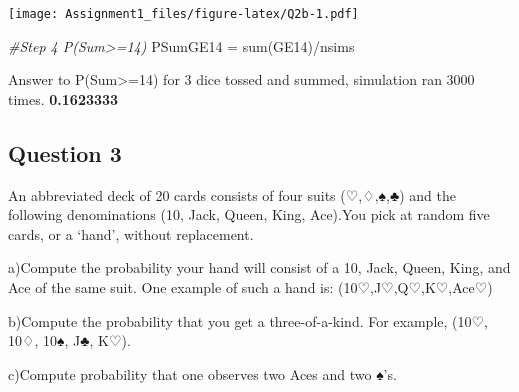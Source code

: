 \documentclass[
]{article}
\newenvironment{Shaded}{\begin{snugshade}}{\end{snugshade}}
\newcommand{\CommentTok}[1]{\textcolor[rgb]{0.56,0.35,0.01}{\textit{#1}}}
\newcommand{\FunctionTok}[1]{\textcolor[rgb]{0.00,0.00,0.00}{#1}}
\newcommand{\NormalTok}[1]{#1}
\newcommand{\OtherTok}[1]{\textcolor[rgb]{0.56,0.35,0.01}{#1}}
\newcommand{\SpecialCharTok}[1]{\textcolor[rgb]{0.00,0.00,0.00}{#1}}
\begin{document}
\texttt{[image: Assignment1\_files/figure-latex/Q2b-1.pdf]}

\begin{Shaded}
\begin{Highlighting}[]
\CommentTok{\#Step 4 P(Sum\textgreater{}=14)}
\NormalTok{PSumGE14 }\OtherTok{=} \FunctionTok{sum}\NormalTok{(GE14)}\SpecialCharTok{/}\NormalTok{nsims}
\end{Highlighting}
\end{Shaded}

Answer to P(Sum\textgreater=14) for 3 dice tossed and summed, simulation
ran 3000 times. \textbf{0.1623333}

\hypertarget{question-3}{%
\subsection{Question 3}\label{question-3}}

An abbreviated deck of 20 cards consists of four suits (♡,♢,♠,♣) and the
following denominations (10, Jack, Queen, King, Ace).You pick at random
five cards, or a `hand', without replacement.

a)Compute the probability your hand will consist of a 10, Jack, Queen,
King, and Ace of the same suit. One example of such a hand is:
(10♡,J♡,Q♡,K♡,Ace♡)

b)Compute the probability that you get a three-of-a-kind. For example,
(10♡, 10♢, 10♠, J♣, K♡).

c)Compute probability that one observes two Aces and two ♠'s.
\end{document}

